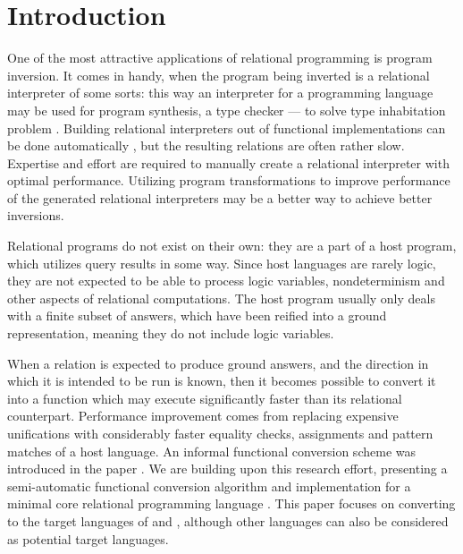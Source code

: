 \section{Introduction}
One of the most attractive applications of relational programming is program inversion.
It comes in handy, when the program being inverted is a relational interpreter of some sorts: this way an interpreter for a programming language may be used for program synthesis, a type checker --- to solve type inhabitation problem .
Building relational interpreters out of functional implementations can be done automatically , but the resulting relations are often rather slow. 
Expertise and effort are required to manually create a relational interpreter with optimal performance.
Utilizing program transformations to improve performance of the generated relational interpreters may be a better way to achieve better inversions.  

Relational programs do not exist on their own: they are a part of a host program, which utilizes query results in some way. 
Since host languages are rarely logic, they are not expected to be able to process logic variables, nondeterminism and other aspects of relational computations. 
The host program usually only deals with a finite subset of answers, which have been reified into a ground representation, meaning they do not include logic variables. 

When a relation is expected to produce ground answers, and the direction in which it is intended to be run is known, then it becomes possible to convert it into a function which may execute significantly faster than its relational counterpart. 
Performance improvement comes from replacing expensive unifications with considerably faster equality checks, assignments and pattern matches of a host language. 
An informal functional conversion scheme was introduced in the paper . 
We are building upon this research effort, presenting a semi-automatic functional conversion algorithm and implementation for a minimal core relational programming language \micro. 
This paper focuses on converting to the target languages of \haskell and \ocaml, although other languages can also be considered as potential target languages.

